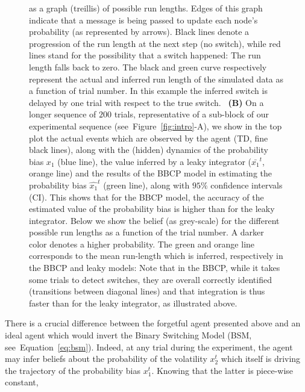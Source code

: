 \documentclass[12pt,english]{article}%
\newcommand{\seeFig}[1]{Figure~\ref{fig:#1}}
\newcommand{\seeEq}[1]{Equation~\ref{eq:#1}}
\newcommand{\AM}[1]{\textbf{\textcolor{blue}{[AM: #1]}}}
\begin{document}
\begin{figure}
{as a graph (treillis) of possible run lengths.
Edges of this graph indicate that a message is being passed
to update each node's probability (as represented by arrows).
Black lines denote a progression of the run length at the next step (no switch),
while red lines stand for the possibility that a switch happened:
The run length falls back to zero.
The black and green curve respectively represent 
the actual and inferred run length of the simulated data
as a function of trial number. 
In this example the inferred switch is delayed 
by one trial with respect to the true switch.
~\textbf{(B)} On a longer sequence of $200$ trials,
representative of a sub-block of our experimental sequence (see~\seeFig{intro}-A), %
we show in the top plot
the actual events which are observed by the agent (TD, fine black lines),
along with the (hidden) dynamics of the probability bias $x_1$ (blue line),
the value inferred by a leaky integrator ($\bar{x_1}^t$, orange line)
and the results of the BBCP model 
in estimating the probability bias $\hat{x_1}^t$ (green line),
along with $95\%$ confidence intervals (CI).
This shows that for the BBCP model,
the accuracy of the estimated value of the probability bias
is higher than for the leaky integrator.
Below we show the belief (as grey-scale) for the different possible run lengths
as a function of the trial number. 
A darker color denotes a higher probability. 
The green and orange line corresponds to the mean run-length which is inferred,
respectively in the BBCP and leaky models:
Note that in the BBCP, while it takes some trials to detect switches,
they are overall correctly identified (transitions between diagonal lines) and
that integration is thus faster than for the leaky integrator, as illustrated above.
}
\label{fig:bayesianchangepoint}
\end{figure}
There is a crucial difference between the forgetful agent presented above
and an ideal agent which would invert the Binary Switching Model (BSM, see~\seeEq{bsm}).
Indeed, at any trial during the experiment,
the agent may infer beliefs about the probability of the volatility $x_2^t$
which itself is driving the trajectory of the probability bias $x_1^t$.
Knowing that the latter is piece-wise constant,
\end{document}
